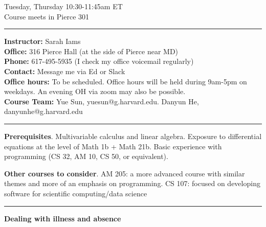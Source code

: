 \documentclass[12pt,letterpaper]{exam}
\begin{document}
\pdfpageheight 11in 
\pdfpagewidth 8.5in
\begin{center}
    Tuesday, Thursday 10:30-11:45am ET \\
    Course meets in Pierce 301 \\ 
\end{center}

\vspace{0.5cm}

\hrule
\vspace{0.5cm}

\noindent \textbf{Instructor:} Sarah Iams \\
\textbf{Office:} 316 Pierce Hall (at the side of Pierce near MD) \\
\textbf{Phone:} 617-495-5935 (I check my office voicemail regularly) \\
\textbf{Contact:} Message me via Ed or Slack \\
\textbf{Office hours:} To be scheduled.  Office hours will be held during 9am-5pm on weekdays.  An evening OH via zoom may also be possible.\\
\textbf{Course Team:} Yue Sun, yuesun@g.harvard.edu.  Danyun He, danyunhe@g.harvard.edu


\vspace{0.5cm}

\hrule
\vspace{0.5cm}

\noindent \textbf{Prerequisites}.  Multivariable calculus and linear algebra.  Exposure to differential equations at the level of Math 1b + Math 21b.  Basic experience with programming (CS 32, AM 10, CS 50, or equivalent).
\vspace{0.1cm}




\noindent \textbf{Other courses to consider}. AM 205: a more advanced course with similar themes and more of an emphasis on programming.  CS 107: focused on developing software for scientific computing/data science

\vspace{0.5cm}

\hrule
\vspace{0.5cm}

\noindent\textbf{Dealing with illness and absence}
\end{document}
